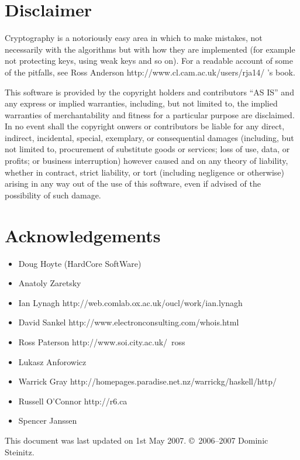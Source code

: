 \documentclass{article}
\begin{document}
\section{Disclaimer}
Cryptography is a notoriously easy area in which to make mistakes, 
not necessarily with the algorithms but with how they are implemented 
(for example not protecting keys, using weak keys and so on). 
For a readable account of some of the pitfalls, see 
\htmladdnormallinkfoot
{Ross Anderson}
{http://www.cl.cam.ac.uk/users/rja14/}
's book.

\begin{sc}
This software is provided by the copyright holders and contributors ``AS IS'' 
and any express or implied warranties, including, but not limited to, 
the implied warranties of merchantability and fitness for a particular 
purpose are disclaimed. In no event shall the copyright onwers or
contributors be liable for any direct, indirect, incidental, special,
exemplary, or consequential damages (including, but not limited to,
procurement of substitute goods or services; loss of use, data, or profits;
or business interruption) however caused and on any theory of liability,
whether in contract, strict liability, or tort (including negligence or
otherwise) arising in any way out of the use of this software,
even if advised of the possibility of such damage.
\end{sc}

\section{Acknowledgements}

\begin{itemize}
\item
Doug Hoyte (HardCore SoftWare)
\item
Anatoly Zaretsky
\item
\htmladdnormallinkfoot
   {Ian Lynagh}
   {http://web.comlab.ox.ac.uk/oucl/work/ian.lynagh}
\item
\htmladdnormallinkfoot
   {David Sankel}
   {http://www.electronconsulting.com/whois.html}
\item
\htmladdnormallinkfoot 
{Ross Paterson}
{http://www.soi.city.ac.uk/~ross}
\item
Lukasz Anforowicz
\item
\htmladdnormallinkfoot 
{Warrick Gray}
{http://homepages.paradise.net.nz/warrickg/haskell/http/}
\item
\htmladdnormallinkfoot 
{Russell O'Connor}
{http://r6.ca}
\item
Spencer Janssen
\end{itemize}

This document was last updated on 1st May 2007.
\copyright\ 2006--2007 Dominic Steinitz. 
\end{document}
